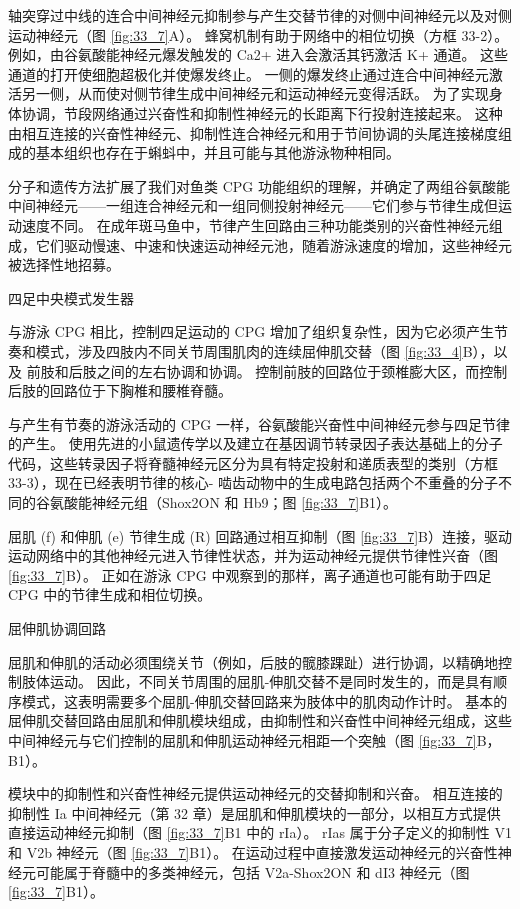 轴突穿过中线的连合中间神经元抑制参与产生交替节律的对侧中间神经元以及对侧运动神经元（图 \ref{fig:33_7}A）。 蜂窝机制有助于网络中的相位切换（方框 33-2）。 例如，由谷氨酸能神经元爆发触发的 Ca2+ 进入会激活其钙激活 K+ 通道。 这些通道的打开使细胞超极化并使爆发终止。 一侧的爆发终止通过连合中间神经元激活另一侧，从而使对侧节律生成中间神经元和运动神经元变得活跃。 为了实现身体协调，节段网络通过兴奋性和抑制性神经元的长距离下行投射连接起来。 这种由相互连接的兴奋性神经元、抑制性连合神经元和用于节间协调的头尾连接梯度组成的基本组织也存在于蝌蚪中，并且可能与其他游泳物种相同。

分子和遗传方法扩展了我们对鱼类 CPG 功能组织的理解，并确定了两组谷氨酸能中间神经元——一组连合神经元和一组同侧投射神经元——它们参与节律生成但运动速度不同。 在成年斑马鱼中，节律产生回路由三种功能类别的兴奋性神经元组成，它们驱动慢速、中速和快速运动神经元池，随着游泳速度的增加，这些神经元被选择性地招募。

四足中央模式发生器

与游泳 CPG 相比，控制四足运动的 CPG 增加了组织复杂性，因为它必须产生节奏和模式，涉及四肢内不同关节周围肌肉的连续屈伸肌交替（图 \ref{fig:33_4}B），以及 前肢和后肢之间的左右协调和协调。 控制前肢的回路位于颈椎膨大区，而控制后肢的回路位于下胸椎和腰椎脊髓。

与产生有节奏的游泳活动的 CPG 一样，谷氨酸能兴奋性中间神经元参与四足节律的产生。 使用先进的小鼠遗传学以及建立在基因调节转录因子表达基础上的分子代码，这些转录因子将脊髓神经元区分为具有特定投射和递质表型的类别（方框 33-3），现在已经表明节律的核心- 啮齿动物中的生成电路包括两个不重叠的分子不同的谷氨酸能神经元组（Shox2ON 和 Hb9；图 \ref{fig:33_7}B1）。

屈肌 (f) 和伸肌 (e) 节律生成 (R) 回路通过相互抑制（图 \ref{fig:33_7}B）连接，驱动运动网络中的其他神经元进入节律性状态，并为运动神经元提供节律性兴奋（图 \ref{fig:33_7}B）。 正如在游泳 CPG 中观察到的那样，离子通道也可能有助于四足 CPG 中的节律生成和相位切换。

屈伸肌协调回路

屈肌和伸肌的活动必须围绕关节（例如，后肢的髋膝踝趾）进行协调，以精确地控制肢体运动。 因此，不同关节周围的屈肌-伸肌交替不是同时发生的，而是具有顺序模式，这表明需要多个屈肌-伸肌交替回路来为肢体中的肌肉动作计时。 基本的屈伸肌交替回路由屈肌和伸肌模块组成，由抑制性和兴奋性中间神经元组成，这些中间神经元与它们控制的屈肌和伸肌运动神经元相距一个突触（图 \ref{fig:33_7}B，B1）。

模块中的抑制性和兴奋性神经元提供运动神经元的交替抑制和兴奋。 相互连接的抑制性 Ia 中间神经元（第 32 章）是屈肌和伸肌模块的一部分，以相互方式提供直接运动神经元抑制（图 \ref{fig:33_7}B1 中的 rIa）。 rIas 属于分子定义的抑制性 V1 和 V2b 神经元（图 \ref{fig:33_7}B1）。 在运动过程中直接激发运动神经元的兴奋性神经元可能属于脊髓中的多类神经元，包括 V2a-Shox2ON 和 dI3 神经元（图 \ref{fig:33_7}B1）。

